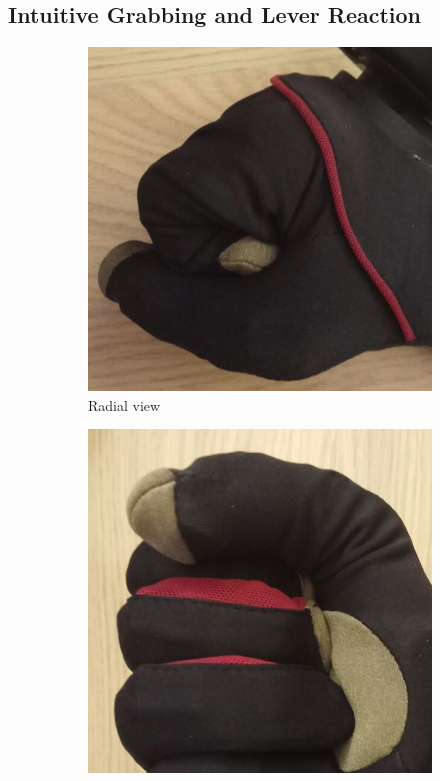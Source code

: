 \documentclass[hyperref, bachelorofscience]{cgvpub}
\begin{document}
\subsection{Intuitive Grabbing and Lever Reaction}
\begin{figure}
	\centering
	\begin{subfigure}{.4\linewidth}
		\includegraphics[width=\linewidth]{../pics/grab1}
		\caption{Radial view}
		\label{fig:grab:radial}
	\end{subfigure}
	\hspace{1cm}
	\begin{subfigure}{.4\linewidth}
		\includegraphics[width=\linewidth]{../pics/grab2}

\end{subfigure}
\end{figure}
\end{document}
